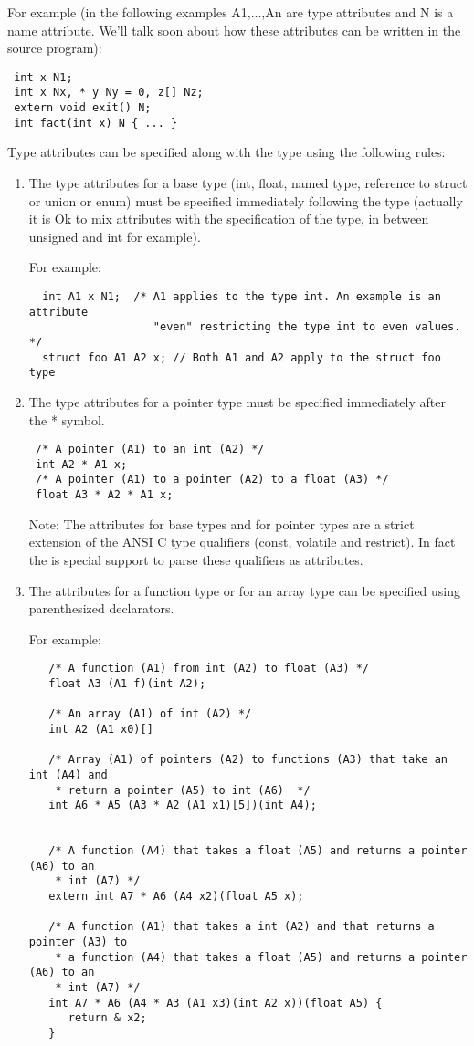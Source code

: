 \documentclass{book}
\begin{document}
 For example (in the following examples A1,...,An are type attributes and N
  is a name attribute. We'll talk soon about how these attributes can be
  written in the source program): 

\begin{verbatim}
 int x N1;
 int x Nx, * y Ny = 0, z[] Nz;
 extern void exit() N;
 int fact(int x) N { ... }
\end{verbatim}


 Type attributes can be specified along with the type using the following
 rules: 
\begin{enumerate}
 \item The type attributes for a base type (int, float, named type, reference
    to struct or union or enum) must be specified immediately following the
    type (actually it is Ok to mix attributes with the specification of the
    type, in between unsigned and int for example).

  For example:
\begin{verbatim}
  int A1 x N1;  /* A1 applies to the type int. An example is an attribute
                   "even" restricting the type int to even values. */
  struct foo A1 A2 x; // Both A1 and A2 apply to the struct foo type
\end{verbatim}
 
 \item The type attributes for a pointer type must be specified immediately
 after the * symbol.
\begin{verbatim}
 /* A pointer (A1) to an int (A2) */
 int A2 * A1 x;
 /* A pointer (A1) to a pointer (A2) to a float (A3) */
 float A3 * A2 * A1 x;
\end{verbatim}


 Note: The attributes for base types and for pointer types are a strict
 extension of the ANSI C type qualifiers (const, volatile and restrict). In
 fact the is special support to parse these qualifiers as attributes. 

  \item The attributes for a function type or for an array type can be
     specified using parenthesized declarators.

   For example:
\begin{verbatim}
   /* A function (A1) from int (A2) to float (A3) */
   float A3 (A1 f)(int A2);

   /* An array (A1) of int (A2) */
   int A2 (A1 x0)[]

   /* Array (A1) of pointers (A2) to functions (A3) that take an int (A4) and 
    * return a pointer (A5) to int (A6)  */
   int A6 * A5 (A3 * A2 (A1 x1)[5])(int A4);


   /* A function (A4) that takes a float (A5) and returns a pointer (A6) to an 
    * int (A7) */
   extern int A7 * A6 (A4 x2)(float A5 x);

   /* A function (A1) that takes a int (A2) and that returns a pointer (A3) to 
    * a function (A4) that takes a float (A5) and returns a pointer (A6) to an 
    * int (A7) */
   int A7 * A6 (A4 * A3 (A1 x3)(int A2 x))(float A5) {
      return & x2;
   }
\end{verbatim}

\end{enumerate}
\end{document}
